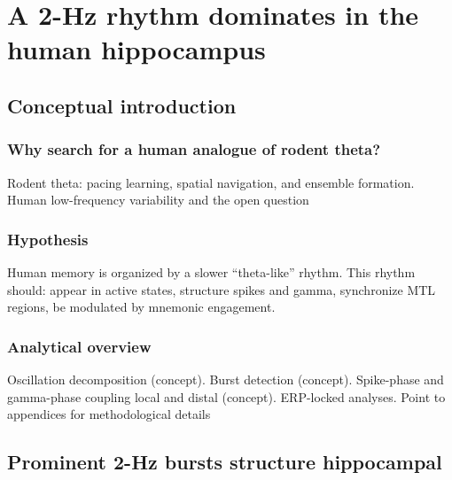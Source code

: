 \documentclass[12pt,a4paper]{report}
\newcommand{\gsp}[1]{\glsentryshortpl{#1}}  %
\begin{document}
\chapter{A 2-Hz rhythm dominates \gsp{lfp} in the human hippocampus} %

\section{Conceptual introduction}
\subsection{Why search for a human analogue of rodent theta?}
Rodent theta: pacing learning, spatial navigation, and ensemble formation. Human low-frequency variability and the open question
\subsection{Hypothesis}
Human memory is organized by a slower “theta-like” rhythm. This rhythm should: appear in active states, structure spikes and gamma, synchronize MTL regions, be modulated by mnemonic engagement.
\subsection{Analytical overview}
Oscillation decomposition (concept). Burst detection (concept). Spike-phase and gamma-phase coupling local and distal (concept). ERP-locked analyses. Point to appendices for methodological details

\section{Prominent 2-Hz bursts structure hippocampal \gsp{lfp}}
\end{document}
